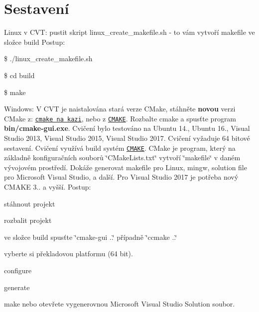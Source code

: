 \hypertarget{index_sestaveni}{}\section{Sestavení}\label{index_sestaveni}
Linux v C\-V\-T\-: pustit skript linux\-\_\-create\-\_\-makefile.\-sh -\/ to vám vytvoří makefile ve složce build Postup\-:
\begin{DoxyEnumerate}
\item \$ ./linux\-\_\-create\-\_\-makefile.sh
\item \$ cd build
\item \$ make
\end{DoxyEnumerate}

Windows\-: V C\-V\-T je naistalována stará verze C\-Make, stáhněte {\bfseries novou} verzi C\-Make z\-: \href{http://www.fit.vutbr.cz/~imilet/shared/cmake-3.11.1-win64-x64.zip}{\tt cmake na kazi}, nebo z \href{https://cmake.org/files/v3.11/cmake-3.11.1-win64-x64.zip}{\tt C\-M\-A\-K\-E}. Rozbalte cmake a spusťte program {\bfseries bin/cmake-\/gui.\-exe}.  Cvičení bylo testováno na Ubuntu 14., Ubuntu 16., Visual Studio 2013, Visual Studio 2015, Visual Studio 2017. Cvičení vyžaduje 64 bitové sestavení. Cvičení využívá build systém \href{https://cmake.org/}{\tt C\-M\-A\-K\-E}. C\-Make je program, který na základně konfiguračních souborů \char`\"{}\-C\-Make\-Lists.\-txt\char`\"{} vytvoří \char`\"{}makefile\char`\"{} v daném vývojovém prostředí. Dokáže generovat makefile pro Linux, mingw, solution file pro Microsoft Visual Studio, a další. Pro Visual Studio 2017 je potřeba nový C\-M\-A\-K\-E 3.. a vyšší. Postup\-:
\begin{DoxyEnumerate}
\item stáhnout projekt
\item rozbalit projekt
\item ve složce build spusťte \char`\"{}cmake-\/gui ..\char`\"{} případně \char`\"{}ccmake ..\char`\"{}
\item vyberte si překladovou platformu (64 bit).
\item configure
\item generate
\item make nebo otevřete vygenerovnou Microsoft Visual Studio Solution soubor.
\end{DoxyEnumerate}

